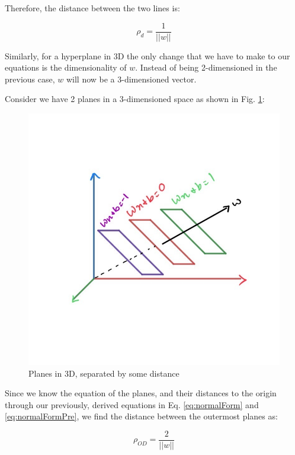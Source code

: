 \documentclass[11pt]{article}
\begin{document}
Therefore, the distance between the two lines is:

\begin{equation} \label{eq:dist2lines}
    \rho_{d} = \dfrac{1}{||w||}
\end{equation}

Similarly, for a hyperplane in 3D the only change that we have to make to our equations is the dimensionality of $w$. Instead of being 2-dimensioned in the previous case, $w$ will now be a 3-dimensioned vector.

Consider we have 2 planes in a 3-dimensioned space as shown in Fig. \ref{fig:3DPlanes}:

\begin{figure}[h]
    \centering
    \includegraphics[scale = 0.40]{figures/planeDistance.jpg}
    \caption{Planes in 3D, separated by some distance}
    \label{fig:3DPlanes}
\end{figure}

Since we know the equation of the planes, and their distances to the origin through our previously, derived equations in Eq. \ref{eq:normalForm} and \ref{eq:normalFormPre}, we find the distance between the outermost planes as:

\begin{equation}
    \rho_{OD} = \dfrac{2}{||w||}
\end{equation}
\end{document}
